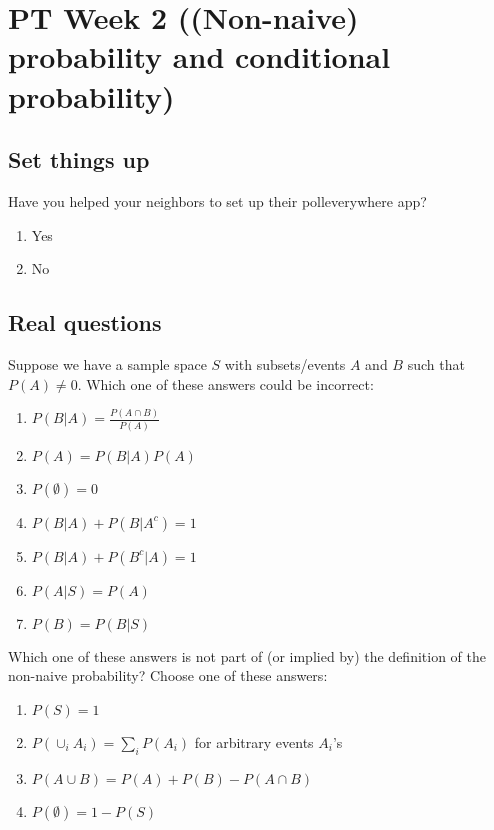 \documentclass[poll_tutorial_format]{subfiles}
\begin{document}
	\maketitle
		\setcounter{section}{1}
	\section{PT Week 2 ((Non-naive) probability and conditional probability)}
	
	\subsection{Set things up}
	\label{sec:set-things-up}
	
	
	
	\setcounter{theorem}{-1}

	\begin{exercise}
		Have you helped your neighbors to set up their polleverywhere app? 
		\begin{enumerate}
			\item Yes
			\item No
		\end{enumerate}
	\end{exercise}
	
	\subsection{Real questions}
	\label{sec:start-real-questions pt week 2}
			\begin{exercise}
		Suppose we have a sample space $S$ with subsets/events $A$ and $B$ such that $P(A)\neq 0$.
		Which one of these answers could be incorrect:
		\begin{enumerate}
			\item $P(B|A)=\frac{P(A\cap B)}{P(A)}$
			\item $P(A)=P(B|A)P(A)$
			\item $P(\emptyset)=0$
			\item $P(B|A)+P(B|A^c)=1$
			\item $P(B|A)+P(B^c|A)=1$
			\item $P(A|S)=P(A)$
			\item $P(B)=P(B|S)$
		\end{enumerate}
	\end{exercise}

	


\begin{exercise}
	Which one of these answers is not part of (or implied by) the definition of the non-naive probability?
	Choose one of these answers: 
	\begin{enumerate}
		\item $P(S)=1$
		\item $P(\cup_i A_i) = \sum_i P(A_i)$ for arbitrary events $A_i$'s
		\item $P(A\cup B)=P(A)+P(B)-P(A\cap B)$
		\item $P(\emptyset)=1-P(S)$
	\end{enumerate}
\end{exercise}
\end{document}
